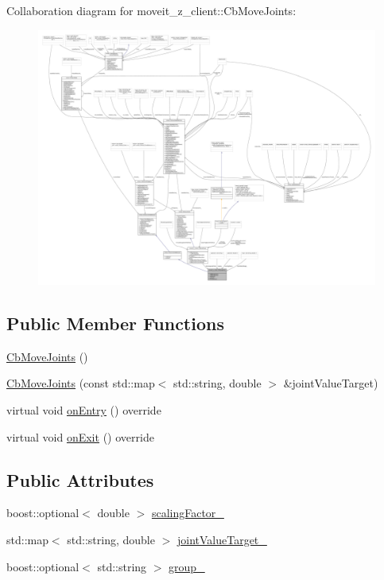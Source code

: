 Collaboration diagram for moveit\+\_\+z\+\_\+client\+:\+:Cb\+Move\+Joints\+:
\nopagebreak
\begin{figure}[H]
\begin{center}
\leavevmode
\includegraphics[width=350pt]{classmoveit__z__client_1_1CbMoveJoints__coll__graph}
\end{center}
\end{figure}
\subsection*{Public Member Functions}
\begin{DoxyCompactItemize}
\item 
\hyperlink{classmoveit__z__client_1_1CbMoveJoints_a8d9f24fd96baa202c546654f3e92f51c}{Cb\+Move\+Joints} ()
\item 
\hyperlink{classmoveit__z__client_1_1CbMoveJoints_ae0f43ac05e5263161541eb6bc15fa457}{Cb\+Move\+Joints} (const std\+::map$<$ std\+::string, double $>$ \&joint\+Value\+Target)
\item 
virtual void \hyperlink{classmoveit__z__client_1_1CbMoveJoints_a512e97e94ab05ee12837433e5d921095}{on\+Entry} () override
\item 
virtual void \hyperlink{classmoveit__z__client_1_1CbMoveJoints_a104abb9c8f8ebb04a6e5c8e84b473add}{on\+Exit} () override
\end{DoxyCompactItemize}
\subsection*{Public Attributes}
\begin{DoxyCompactItemize}
\item 
boost\+::optional$<$ double $>$ \hyperlink{classmoveit__z__client_1_1CbMoveJoints_aadb5410711e277fab3a637cb4835fb3b}{scaling\+Factor\+\_\+}
\item 
std\+::map$<$ std\+::string, double $>$ \hyperlink{classmoveit__z__client_1_1CbMoveJoints_a0f52577dd2fccf25f36c4c93e733c0f4}{joint\+Value\+Target\+\_\+}
\item 
boost\+::optional$<$ std\+::string $>$ \hyperlink{classmoveit__z__client_1_1CbMoveJoints_ac75cb07d2292b2080266c36e4d18fc41}{group\+\_\+}
\end{DoxyCompactItemize}
